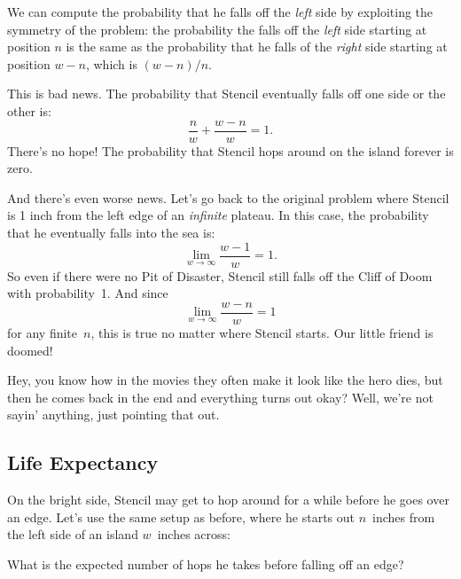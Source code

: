 We can compute the probability that he falls off the \emph{left}
side by exploiting the symmetry of the problem: the probability the
falls off the \emph{left} side starting at position $n$ is the same
as the probability that he falls of the \emph{right} side starting
at position $w - n$, which is $(w - n) / n$.

This is bad news.  The probability that Stencil eventually falls off
one side or the other is:
%
\[
    \frac{n}{w} + \frac{w - n}{w} = 1.
\]
%
There's no hope!  The probability that Stencil hops around on the
island forever is zero.

And there's even worse news.  Let's go back to the original problem
where Stencil is 1 inch from the left edge of an \emph{infinite}
plateau.  In this case, the probability that he eventually falls into
the sea is:
%
\[
    \lim_{w \to \infty} \frac{w - 1}{w} = 1.
\]
So even if there were no Pit of Disaster, Stencil still falls off the
Cliff of Doom with probability~1.  And since
\begin{equation*}
    \lim_{w \to \infty} \frac{w - n }{w} = 1
\end{equation*}
for any finite~$n$, this is true no matter where Stencil starts.  Our
little friend is doomed!

Hey, you know how in the movies they often make it look like the hero
dies, but then he comes back in the end and everything turns out okay?
Well, we're not sayin' anything, just pointing that out.

\subsection{Life Expectancy}\label{sec:life_expectancy}

On the bright side, Stencil may get to hop around for a while before
he goes over an edge.  Let's use the same setup as before, where he
starts out $n$~inches from the left side of an island $w$~inches
across:
%
\begin{figure}[h]
\end{figure}
%
What is the expected number of hops he takes before falling off an
edge?

